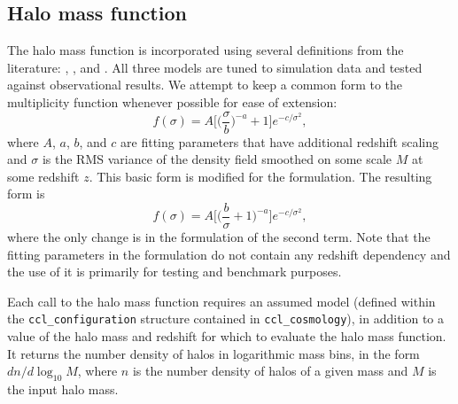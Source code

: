 \documentclass[\docopts]{\docclass}
\begin{document}
%
%
%


\subsection{Halo mass function}
\label{sec:hmf}
The halo mass function is incorporated using several definitions from the literature: \citet{Tinker2008}, \citet{Angulo2012}, and \citet{Watson2013}. All three models are tuned to simulation data and tested against observational results. We attempt to keep a common form to the multiplicity function whenever possible for ease of extension:
\begin{equation}
f(\sigma)=A\Big[\Big(\frac{\sigma}{b}\Big)^{-a}+1\Big]e^{-c/{\sigma}^2},
\end{equation}
where $A$, $a$, $b$, and $c$ are fitting parameters that have additional redshift scaling and $\sigma$ is the RMS variance of the density field smoothed on some scale $M$ at some redshift $z$. This basic form is modified for the \citet{Angulo2012} formulation. The resulting form is
\begin{equation}
f(\sigma)=A\Big[\Big(\frac{b}{\sigma}+1\Big)^{-a}\Big]e^{-c/{\sigma}^2},
\end{equation}
where the only change is in the formulation of the second term. Note that the fitting parameters in the \citet{Angulo2012} formulation do not contain any redshift dependency and the use of it is primarily for testing and benchmark purposes.

Each call to the halo mass function requires an assumed model (defined within the {\tt ccl\_configuration} structure contained in {\tt ccl\_cosmology}), in addition to a value of the halo mass and redshift for which to evaluate the halo mass function. It returns the number density of halos in logarithmic mass bins, in the form $dn/d\log_{10}{M}$, where $n$ is the number density of halos of a given mass and $M$ is the input halo mass.
\end{document}

